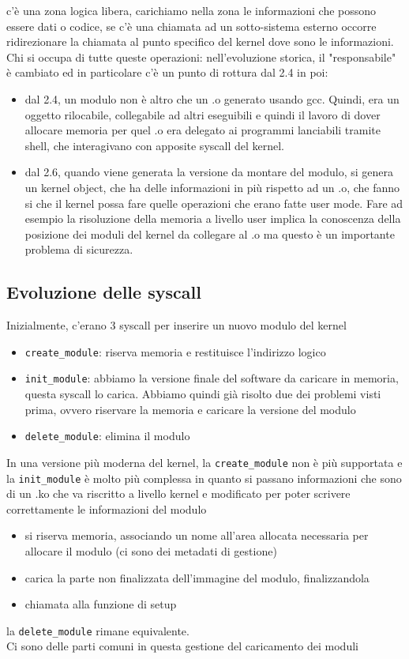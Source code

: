 \documentclass[12pt, oneside]{extbook}
\begin{document}
c'è una zona logica libera, carichiamo nella zona le informazioni che possono essere dati o codice, se c'è una chiamata ad un sotto-sistema esterno occorre ridirezionare la chiamata al punto specifico del kernel dove sono le informazioni.\\ Chi si occupa di tutte queste operazioni: nell'evoluzione storica, il "responsabile" è cambiato ed in particolare c'è un punto di rottura dal 2.4 in poi:
\begin{itemize}
\item dal 2.4, un modulo non è altro che un .o generato usando gcc. Quindi, era un oggetto rilocabile, collegabile ad altri eseguibili e quindi il lavoro di dover allocare memoria per quel .o era delegato ai programmi lanciabili tramite shell, che interagivano con apposite syscall del kernel.
\item dal 2.6, quando viene generata la versione da montare del modulo, si genera un kernel object, che ha delle informazioni in più rispetto ad un .o, che fanno si che il kernel possa fare quelle operazioni che erano fatte user mode. Fare ad esempio la risoluzione della memoria a livello user implica la conoscenza della posizione dei moduli del kernel da collegare al .o ma questo è un importante problema di sicurezza.
\end{itemize}
\subsection{Evoluzione delle syscall}
Inizialmente, c'erano 3 syscall per inserire un nuovo modulo del kernel
\begin{itemize}
\item \texttt{create\_module}: riserva memoria e restituisce l'indirizzo logico
\item \texttt{init\_module}: abbiamo la versione finale del software da caricare in memoria, questa syscall lo carica. Abbiamo quindi già risolto due dei problemi visti prima, ovvero riservare la memoria e caricare la versione del modulo
\item \texttt{delete\_module}: elimina il modulo
\end{itemize}
In una versione più moderna del kernel, la \texttt{create\_module} non è più supportata e la \texttt{init\_module} è molto più complessa in quanto si passano informazioni che sono di un .ko che va riscritto a livello kernel e modificato per poter scrivere correttamente le informazioni del modulo
\begin{itemize}
\item si riserva memoria, associando un nome all'area allocata necessaria per allocare il modulo (ci sono dei metadati di gestione)
\item carica la parte non finalizzata dell'immagine del modulo, finalizzandola
\item chiamata alla funzione di setup
\end{itemize}
la \texttt{delete\_module} rimane equivalente.\\Ci sono delle parti comuni in questa gestione del caricamento dei moduli
\end{document}
